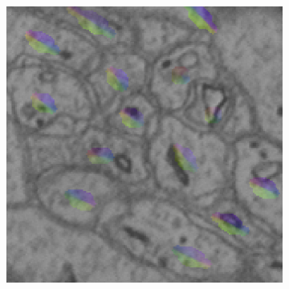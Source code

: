 \begin{figure}[htpb]
\begin{subfigure}[b]{\mywidth}
		\includegraphics[width=\textwidth]{data/images/fieldLearning/fi_im_field.png}
		\caption{\label{fig:fi_im_f}}
	\end{subfigure}\\
	

\end{figure}
